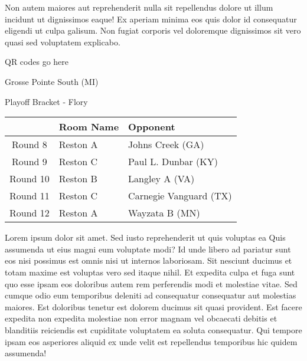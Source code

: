 \documentclass{article}%
\begin{document}
\newline%
Non autem maiores aut reprehenderit nulla sit repellendus dolore ut illum incidunt ut dignissimos eaque! Ex aperiam minima eos quis dolor id consequatur eligendi ut culpa galisum. Non fugiat corporis vel doloremque dignissimos sit vero quasi sed voluptatem explicabo.\newline%
\newline%
%
\vspace*{30pt}%
\begin{center}%
\begin{Huge}%
QR codes go here%
\end{Huge}%
\end{center}%
\newpage%
\begin{center}%
\begin{Huge}%
Grosse Pointe South (MI)%
\end{Huge}%
\vspace*{8pt}%
\linebreak%
\begin{Large}%
Playoff Bracket {-} Flory%
\end{Large}%
\end{center}%
\begin{tabularx}{\textwidth}{|c|Y|Y|}%
\hline%
&Room Name&Opponent\\%
\hline%
Round 8&Reston A&Johns Creek (GA)\\%
Round 9&Reston C&Paul L. Dunbar (KY)\\%
Round 10&Reston B&Langley A (VA)\\%
Round 11&Reston C&Carnegie Vanguard (TX)\\%
Round 12&Reston A&Wayzata B (MN)\\%
\hline%
\end{tabularx}%
\vspace*{8pt}%
\linebreak%
\newline%
\newline%
Lorem ipsum dolor sit amet. Sed iusto reprehenderit ut quis voluptas ea Quis assumenda ut eius magni eum voluptate modi? Id unde libero ad pariatur sunt eos nisi possimus est omnis nisi ut internos laboriosam. Sit nesciunt ducimus et totam maxime est voluptas vero sed itaque nihil. Et expedita culpa et fuga sunt quo esse ipsam eos doloribus autem rem perferendis modi et molestiae vitae.\newline%
\newline%
Sed cumque odio eum temporibus deleniti ad consequatur consequatur aut molestias maiores. Est doloribus tenetur est dolorem ducimus sit quasi provident. Est facere expedita non expedita molestiae non error magnam vel obcaecati debitis et blanditiis reiciendis est cupiditate voluptatem ea soluta consequatur. Qui tempore ipsam eos asperiores aliquid ex unde velit est repellendus temporibus hic quidem assumenda!\newline%
\end{document}
